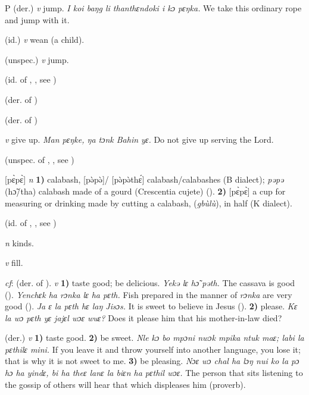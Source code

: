 \begin{letter}{P}
 (der.) \textit{v} jump. \textit{I koi baŋg li thanthɛndoki i kɔ pɛŋka.} We take this ordinary rope and jump with it.

 (id.) \textit{v} wean (a child).

 (unspec.) \textit{v} jump.

 (id. of , , see ) 

 (der. of ) 

 (der. of ) 

 \textit{v} give up. \textit{Man pɛŋke, ŋa tɔnk Bahin yɛ.} Do not give up serving the Lord.

 (unspec. of , , see ) 

 [pɛ̀pɛ̀] \textit{n} \textbf{1)} calabash, [pə̀pə̀]/ [pə̀pə̀thɛ́] calabash/calabashes (B dialect); \textit{pəpə} (hɔ̃/tha) calabash made of a gourd (Crescentia cujete) (\citealt{Pichl1967}). \textbf{2)} [pɛ̀pɛ̀] a cup for measuring or drinking made by cutting a calabash, (\textit{gbùlù}), in half (K dialect).

 (id. of , , see ) 

 \textit{n} kinds.

 \textit{v} fill.

 \textit{cf}:  (der. of ). \textit{v} \textbf{1)} taste good; be delicious. \textit{Yekə lɛ hɔ̃ pəth.} The cassava is good (\citealt{Pichl1967}). \textit{Yenchɛk ha rɔnka lɛ ha pɛth.} Fish prepared in the manner of \textit{rɔnka} are very good (\citealt{Pichl1967}). \textit{Ja ɛ la pɛth hɛ laŋ Jisɔs.} It is sweet to believe in Jesus (\citealt{Pichl1967}). \textbf{2)} please. \textit{Kɛ la wɔ pɛth yɛ jajɛl wɔɛ wuɛ?} Does it please him that his mother-in-law died?

 (der.) \textit{v} \textbf{1)} taste good. \textbf{2)} be sweet. \textit{Nle kɔ bo mpɔni nwɔk mpika ntuk maɛ; labi la pɛthilɛ mini.} If you leave it and throw yourself into another language, you lose it; that is why it is not sweet to me. \textbf{3)} be pleasing. \textit{Nɔɛ wɔ chal ha lɔŋ nui ko la pɔ hɔ ha yindɛ, bi ha theɛ lanɛ la biɛn ha pɛthil wɔɛ.} The person that sits listening to the gossip of others will hear that which displeases him (proverb). 


\end{letter}
